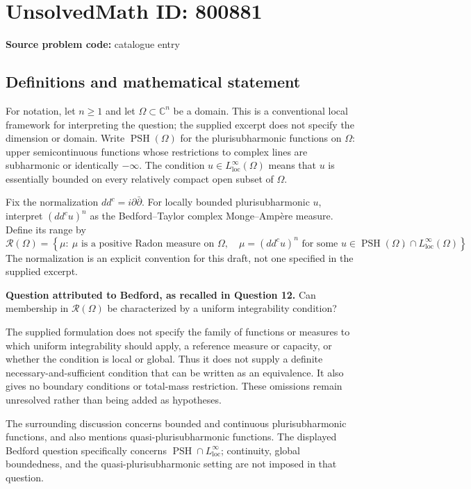 \documentclass[11pt]{article}
\newcommand{\C}{\mathbb{C}}
\begin{document}
\section*{UnsolvedMath ID: 800881}
\textbf{Source problem code:} catalogue entry
\subsection{Definitions and mathematical statement}
For notation, let \(n\geq 1\) and let \(\Omega\subset\C^n\) be a domain. This is a conventional local framework for interpreting the question; the supplied excerpt does not specify the dimension or domain. Write \(\operatorname{PSH}(\Omega)\) for the plurisubharmonic functions on \(\Omega\): upper semicontinuous functions whose restrictions to complex lines are subharmonic or identically \(-\infty\). The condition \(u\in L^\infty_{\mathrm{loc}}(\Omega)\) means that \(u\) is essentially bounded on every relatively compact open subset of \(\Omega\).

Fix the normalization \(dd^c=i\partial\bar\partial\). For locally bounded plurisubharmonic \(u\), interpret \((dd^c u)^n\) as the Bedford--Taylor complex Monge--Amp\`ere measure. Define its range by
\[
\mathcal R(\Omega)=\left\{\mu:\ \mu\text{ is a positive Radon measure on }\Omega,\quad \mu=(dd^c u)^n\text{ for some }u\in\operatorname{PSH}(\Omega)\cap L^\infty_{\mathrm{loc}}(\Omega)\right\}.
\]
The normalization is an explicit convention for this draft, not one specified in the supplied excerpt.

\textbf{Question attributed to Bedford, as recalled in Question 12.} Can membership in \(\mathcal R(\Omega)\) be characterized by a uniform integrability condition?

The supplied formulation does not specify the family of functions or measures to which uniform integrability should apply, a reference measure or capacity, or whether the condition is local or global. Thus it does not supply a definite necessary-and-sufficient condition that can be written as an equivalence. It also gives no boundary conditions or total-mass restriction. These omissions remain unresolved rather than being added as hypotheses.

The surrounding discussion concerns bounded and continuous plurisubharmonic functions, and also mentions quasi-plurisubharmonic functions. The displayed Bedford question specifically concerns \(\operatorname{PSH}\cap L^\infty_{\mathrm{loc}}\); continuity, global boundedness, and the quasi-plurisubharmonic setting are not imposed in that question.
\end{document}
